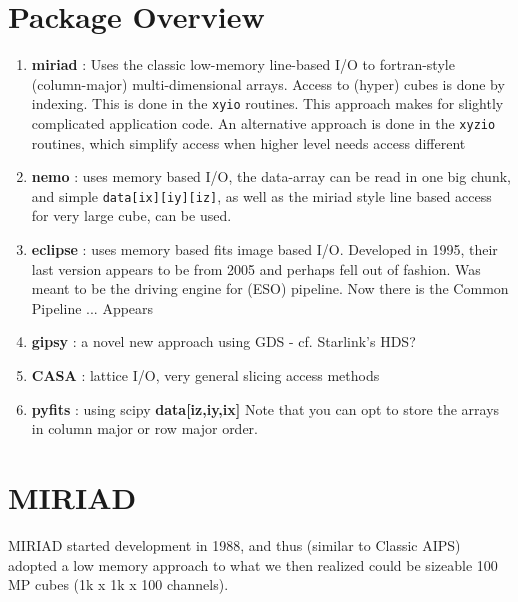 \documentclass[preprint]{aastex} %
\begin{document}
\section{Package Overview}



\begin{enumerate}

\item  {\bf miriad} : Uses the classic low-memory line-based I/O 
to fortran-style (column-major) multi-dimensional arrays. Access
to (hyper) cubes is done by indexing. This is done in the
{\tt xyio} routines.   This approach makes for slightly complicated
application code.
An alternative approach is done in the 
{\tt xyzio} routines, which simplify access when higher level needs
access different


\item  {\bf nemo} : uses memory based I/O, the data-array can be read
in one big chunk, and simple {\tt data[ix][iy][iz]}, as well as the
miriad style line based access for very large cube, can be used.


\item  {\bf eclipse} : uses memory based fits image based
I/O. Developed in 1995, their last version appears to
be from 2005 and perhaps fell out of fashion. Was meant to be the driving
engine for (ESO) pipeline. Now there is the Common Pipeline ...
Appears 


\item  {\bf gipsy} : a novel new approach using GDS - cf. Starlink's HDS?

\item  {\bf CASA} : lattice I/O, very general slicing access methods

\item {\bf pyfits} : using scipy {\bf data[iz,iy,ix]}
Note that you can opt to store the arrays in column major or row major order.


\end{enumerate}



\section{MIRIAD}

MIRIAD started development in 1988, and thus (similar to Classic AIPS)
adopted a low memory approach
to what we then realized could be sizeable 100 MP 
cubes (1k x 1k x 100 channels). 
\end{document}
